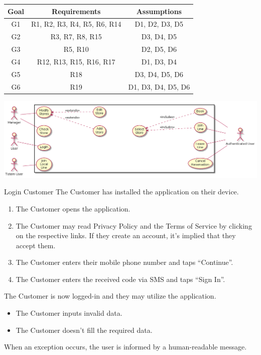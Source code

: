 \begin{center}
    \begin{tabular}{ |c||c|c| }
        \hline
        \textbf{Goal} & \textbf{Requirements} & \textbf{Assumptions} \\
        \hline
        G1 & R1, R2, R3, R4, R5, R6, R14 & D1, D2, D3, D5 \\ %
        \hline
        G2 & R3, R7, R8, R15 & D3, D4, D5 \\ %
        \hline
        G3 & R5, R10 & D2, D5, D6\\ %
        \hline
        G4 & R12, R13, R15, R16, R17 & D1, D3, D4 \\ %
        \hline
        G5 & R18 & D3, D4, D5, D6 \\ %
        \hline
        G6 & R19 & D1, D3, D4, D5, D6 \\ %
        \hline
    \end{tabular}
\end{center}

\begin{center}
    \includegraphics[width=0.9\columnwidth]{uml/usecase.png}
\end{center}



\usecase
{Login}
{Customer}
{The Customer has installed the application on their device.}
{
    \begin{enumerate}
        \item The Customer opens the application.
        \item The Customer may read Privacy Policy and the Terms of Service by clicking on the respective links. If they create an account, it's implied that they accept them.
        \item The Customer enters their mobile phone number and taps ``Continue''.
        \item The Customer enters the received code via SMS and taps ``Sign In''.
    \end{enumerate}
}
{The Customer is now logged-in and they may utilize the application.}
{
    \begin{itemize}
        \item The Customer inputs invalid data.
        \item The Customer doesn't fill the required data.
    \end{itemize}
}
{
    When an exception occurs, the user is informed by a human-readable message.
}

